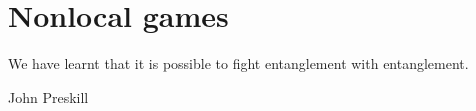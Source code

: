 \section{Nonlocal games}
\epigraph{We have learnt that it is possible to fight entanglement with entanglement.}{John Preskill}


